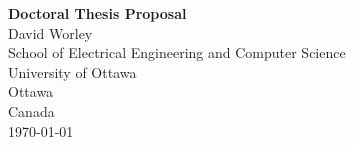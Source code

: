 \documentclass{article}
\theoremstyle{definition}
\begin{document}
\begin{titlepage}
\begin{center}
    \Huge \textbf{Doctoral Thesis Proposal} \\
    \vspace{.5cm}
    \LARGE David Worley \\
    \vfill
    \large
    School of Electrical Engineering and Computer Science \\
    University of Ottawa\\
    Ottawa \\
    Canada \\
    \today
\end{center}
\end{titlepage}






\end{document}

